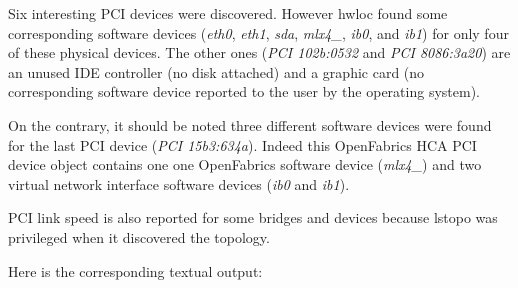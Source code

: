 Six interesting PCI devices were discovered. However hwloc found some corresponding software devices ({\itshape eth0\/}, {\itshape eth1\/}, {\itshape sda\/}, {\itshape mlx4\_\/}, {\itshape ib0\/}, and {\itshape ib1\/}) for only four of these physical devices. The other ones ({\itshape PCI 102b:0532\/} and {\itshape PCI 8086:3a20\/}) are an unused IDE controller (no disk attached) and a graphic card (no corresponding software device reported to the user by the operating system).

On the contrary, it should be noted three different software devices were found for the last PCI device ({\itshape PCI 15b3:634a\/}). Indeed this OpenFabrics HCA PCI device object contains one one OpenFabrics software device ({\itshape mlx4\_\/}) and two virtual network interface software devices ({\itshape ib0\/} and {\itshape ib1\/}).

PCI link speed is also reported for some bridges and devices because lstopo was privileged when it discovered the topology.

Here is the corresponding textual output:

 